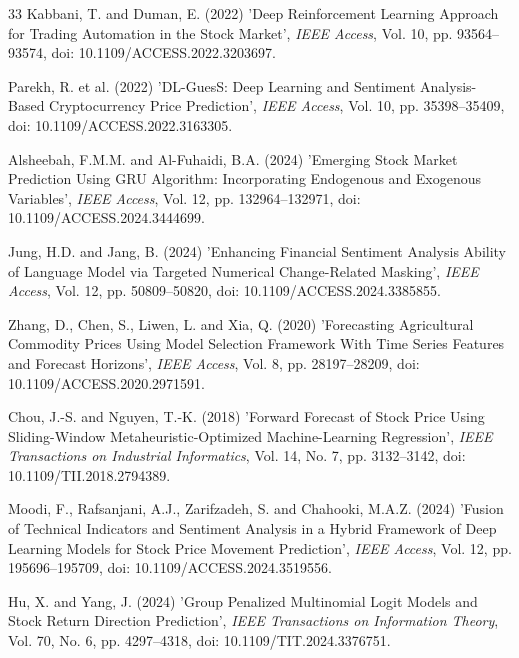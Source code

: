\documentclass{singlecol-new}
\theoremstyle{TH}{
\newtheorem{lemma}{Lemma}
\newtheorem{theorem}[lemma]{Theorem}
\newtheorem{corrolary}[lemma]{Corrolary}
\newtheorem{conjecture}[lemma]{Conjecture}
\newtheorem{proposition}[lemma]{Proposition}
\newtheorem{claim}[lemma]{Claim}
\newtheorem{stheorem}[lemma]{Wrong Theorem}
\newtheorem{algorithm}{Algorithm}
}
\theoremstyle{THrm}{
\newtheorem{definition}{Definition}[section]
\newtheorem{question}{Question}[section]
\newtheorem{remark}{Remark}
\newtheorem{scheme}{Scheme}
}
\theoremstyle{THhit}{
\newtheorem{case}{Case}[section]
}
\begin{document}
\begin{thebibliography}{33}
Kabbani, T. and Duman, E. (2022) 'Deep Reinforcement Learning Approach for Trading Automation in the Stock Market', {\it IEEE Access}, Vol. 10, pp. 93564--93574, doi: 10.1109/ACCESS.2022.3203697.

Parekh, R. et al. (2022) 'DL-GuesS: Deep Learning and Sentiment Analysis-Based Cryptocurrency Price Prediction', {\it IEEE Access}, Vol. 10, pp. 35398--35409, doi: 10.1109/ACCESS.2022.3163305.

Alsheebah, F.M.M. and Al-Fuhaidi, B.A. (2024) 'Emerging Stock Market Prediction Using GRU Algorithm: Incorporating Endogenous and Exogenous Variables', {\it IEEE Access}, Vol. 12, pp. 132964--132971, doi: 10.1109/ACCESS.2024.3444699.

Jung, H.D. and Jang, B. (2024) 'Enhancing Financial Sentiment Analysis Ability of Language Model via Targeted Numerical Change-Related Masking', {\it IEEE Access}, Vol. 12, pp. 50809--50820, doi: 10.1109/ACCESS.2024.3385855.

Zhang, D., Chen, S., Liwen, L. and Xia, Q. (2020) 'Forecasting Agricultural Commodity Prices Using Model Selection Framework With Time Series Features and Forecast Horizons', {\it IEEE Access}, Vol. 8, pp. 28197--28209, doi: 10.1109/ACCESS.2020.2971591.

Chou, J.-S. and Nguyen, T.-K. (2018) 'Forward Forecast of Stock Price Using Sliding-Window Metaheuristic-Optimized Machine-Learning Regression', {\it IEEE Transactions on Industrial Informatics}, Vol. 14, No. 7, pp. 3132--3142, doi: 10.1109/TII.2018.2794389.

Moodi, F., Rafsanjani, A.J., Zarifzadeh, S. and Chahooki, M.A.Z. (2024) 'Fusion of Technical Indicators and Sentiment Analysis in a Hybrid Framework of Deep Learning Models for Stock Price Movement Prediction', {\it IEEE Access}, Vol. 12, pp. 195696--195709, doi: 10.1109/ACCESS.2024.3519556.

Hu, X. and Yang, J. (2024) 'Group Penalized Multinomial Logit Models and Stock Return Direction Prediction', {\it IEEE Transactions on Information Theory}, Vol. 70, No. 6, pp. 4297--4318, doi: 10.1109/TIT.2024.3376751.


\end{thebibliography}
\end{document}
